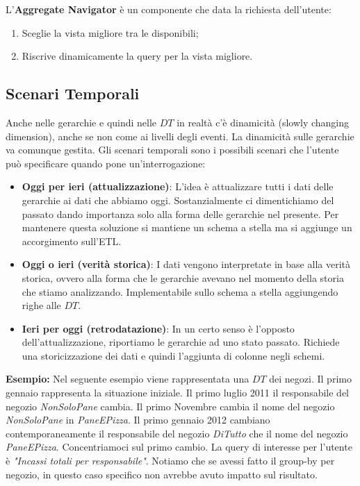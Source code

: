 L'\textbf{Aggregate Navigator} è un componente che data la richiesta dell'utente:
\begin{enumerate}
	\item Sceglie la vista migliore tra le disponibili;
	\item Riscrive dinamicamente la query per la vista migliore.
\end{enumerate}

\subsection{Scenari Temporali}
Anche nelle gerarchie e quindi nelle $DT$ in realtà c'è dinamicità (slowly changing dimension), anche se non come ai livelli degli eventi. La dinamicità sulle gerarchie va comunque gestita.
Gli scenari temporali sono i possibili scenari che l'utente può specificare quando pone un'interrogazione:
\begin{itemize}
	\item \textbf{Oggi per ieri (attualizzazione)}: L'idea è attualizzare tutti i dati delle gerarchie ai dati che abbiamo oggi. Sostanzialmente ci dimentichiamo del passato dando importanza solo alla forma delle gerarchie nel presente. Per mantenere questa soluzione si mantiene un schema a stella ma si aggiunge un accorgimento sull'ETL.
	\item \textbf{Oggi o ieri (verità storica)}: I dati vengono interpretate in base alla verità storica, ovvero alla forma che le gerarchie avevano nel momento della storia che stiamo analizzando. Implementabile sullo schema a stella aggiungendo righe alle $DT$.
	\item \textbf{Ieri per oggi (retrodatazione)}: In un certo senso è l'opposto dell'attualizzazione, riportiamo le gerarchie ad uno stato passato. Richiede una storicizzazione dei dati e quindi l'aggiunta di colonne negli schemi.
\end{itemize}
\textbf{Esempio:}
Nel seguente esempio viene rappresentata una $DT$ dei negozi.
\noindent Il primo gennaio rappresenta la situazione iniziale. Il primo luglio 2011 il responsabile del negozio \textit{NonSoloPane} cambia. Il primo Novembre cambia il nome del negozio \textit{NonSoloPane} in \textit{PaneEPizza}. Il primo gennaio 2012 cambiano contemporaneamente il responsabile del negozio \textit{DiTutto} che il nome del negozio \textit{PaneEPizza}. Concentriamoci sul primo cambio. La query di interesse per l'utente è \textit{"Incassi totali per responsabile"}. Notiamo che se avessi fatto il group-by per negozio, in questo caso specifico non avrebbe avuto impatto sul risultato.
